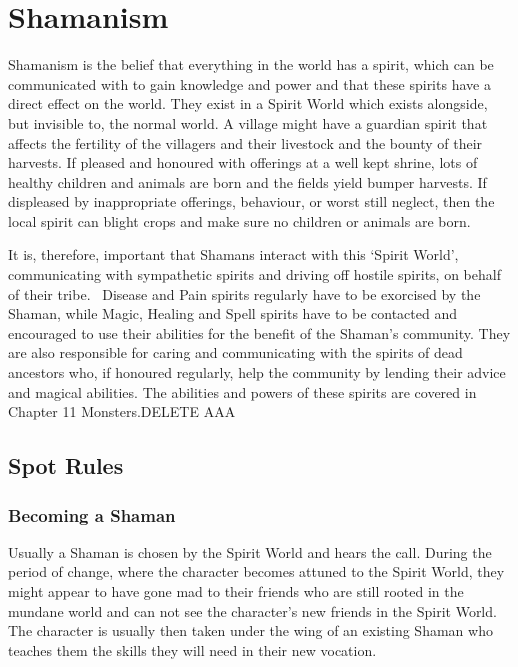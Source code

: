 \chapter{Shamanism}
\label{ch:shamanism}

Shamanism is the belief that everything in the world has a spirit, which can be communicated with to gain knowledge and power and that these spirits have a direct effect on the world. They exist in a Spirit World which exists alongside, but invisible to, the normal world. A village might have a guardian spirit that affects the fertility of the villagers and their livestock and the bounty of their harvests. If pleased and honoured with offerings at a well kept shrine, lots of healthy children and animals are born and the fields yield bumper harvests. If displeased by inappropriate offerings, behaviour, or worst still neglect, then the local spirit can blight crops and make sure no children or animals are born.

It is, therefore, important that Shamans interact with this ‘Spirit World’, communicating with sympathetic spirits and driving off hostile spirits, on behalf of their tribe.  Disease and Pain spirits regularly have to be exorcised by the Shaman, while Magic, Healing and Spell spirits have to be contacted and encouraged to use their abilities for the benefit of the Shaman’s community. They are also responsible for caring and communicating with the spirits of dead ancestors who, if honoured regularly, help the community by lending their advice and magical abilities. The abilities and powers of these spirits are covered in Chapter 11 Monsters.DELETE AAA

\section{Spot Rules}

\subsection{Becoming a Shaman}
Usually a Shaman is chosen by the Spirit World and hears the call. During the period of change, where the character becomes attuned to the Spirit World, they might appear to have gone mad to their friends who are still rooted in the mundane world and can not see the character’s new friends in the Spirit World.  The character is usually then taken under the wing of an existing Shaman who teaches them the skills they will need in their new vocation.

